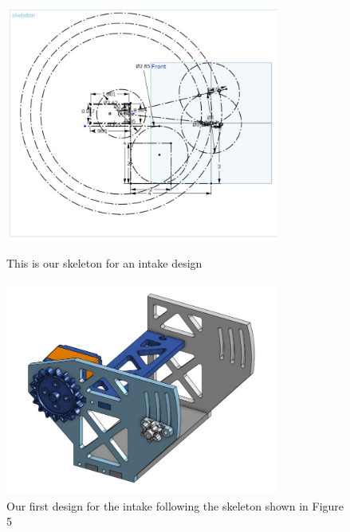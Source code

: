 \begin{figure}[ht]
\centering
\begin{minipage}[b]{.50\textwidth}
  \centering
  \includegraphics[width=0.8\textwidth]{Meetings/August/08-20-21/8-18-21_CAD_Image5 - Nathan Forrer.jpg}
  \caption{This is our skeleton for an intake design}
  \label{fig:pic5}
\end{minipage}%
\hfill%
\begin{minipage}[b]{.50\textwidth}
  \centering
  \includegraphics[width=0.8\textwidth]{Meetings/August/08-20-21/8-18-21_CAD_Image6 - Nathan Forrer.jpg}
  \caption{Our first design for the intake following the skeleton shown in Figure 5}
  \label{fig:pic6}
\end{minipage}
\end{figure}

